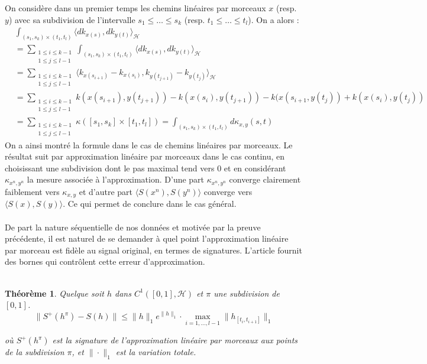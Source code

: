 \documentclass[10pt,a4paper]{article}
\newtheorem{theoreme}{Théorème}
\begin{document}
On considère dans un premier temps les chemins linéaires par morceaux $x$ (resp. $y$) avec sa subdivision de l'intervalle $s_1 \leq \ldots \leq s_k$ (resp. $t_1 \leq \ldots \leq t_l$). On a alors :
\begin{align*}
&\int_{(s_1 , s_k) \times (t_1 , t_l )} \langle dk_{x(s)} , dk_{y(t) } \rangle_{\mathcal{H}}\\
&= \sum_{\substack{1\leq i \leq k-1 \\ 1 \leq j \leq l-1}} \int_{(s_1 , s_k) \times (t_1 , t_l )} \langle dk_{x(s)} , dk_{y(t) } \rangle_{\mathcal{H}}\\
&= \sum_{\substack{1\leq i \leq k-1 \\ 1 \leq j \leq l-1}} \langle k_{x(s_{i+1})} - k_{x(s_i )}, k_{y(t_{j+1})} - k_{y(t_j )} \rangle_{\mathcal{H}}\\
&= \sum_{\substack{1\leq i \leq k-1 \\ 1 \leq j \leq l-1}} k(x(s_{i+1}), y(t_{j+1})) - k(x(s_i), y(t_{j+1})) - k(x(s_{i+1}, y(t_j )) + k(x(s_i ), y(t_j ))\\
&= \sum_{\substack{1\leq i \leq k-1 \\ 1 \leq j \leq l-1}} \kappa([s_1 , s_k] \times [t_1 , t_l ]) = \int_{(s_1 , s_k) \times (t_1 , t_l )} d\kappa_{x,y} (s,t)
\end{align*}
On a ainsi montré la formule dans le cas de chemins linéaires par morceaux. Le résultat suit par approximation linéaire par morceaux dans le cas continu, en choisissant une subdivision dont le pas maximal tend vers $0$ et en considérant $\kappa_{x^n, y^n}$ la mesure associée à l'approximation.
D'une part $\kappa_{x^n, y^n}$ converge clairement faiblement vers $\kappa_{x,y}$ et d'autre part $\langle S(x^n) , S(y^n) \rangle$ converge vers $\langle S(x) , S(y) \rangle$. Ce qui permet de conclure dans le cas général.\\ \\

De part la nature séquentielle de nos données et motivée par la preuve précédente, il est naturel de se demander à quel point l'approximation linéaire par morceau est fidèle au signal original, en termes de signatures. L'article fournit des bornes qui contrôlent cette erreur d'approximation. \\ \\

\begin{theoreme}
Quelque soit $h$ dans $C^1 ([0,1], \mathcal{H})$ et $\pi$ une subdivision de $[0,1]$.
\[
\| S^+ (h^\pi ) - S(h) \| \leq \| h \|_1 e^{\| h \|_1 } \cdot \max_{i=1, \ldots , l-1 } \| h_{[t_i , t_{i+1}]}\|_1
\]

où $S^+ (h^\pi)$ est la signature de l'approximation linéaire par morceaux aux points de la subdivision $\pi$, et $\| \cdot \|_1$ est la variation totale.
\end{theoreme}
\end{document}
